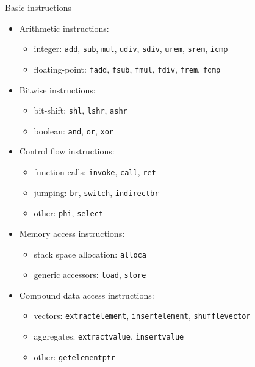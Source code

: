 \documentclass[8pt]{beamer}
\begin{document}
\begin{frame}[fragile]{Basic instructions}
  \begin{block}{}
    \begin{itemize}
      \item Arithmetic instructions:
        \begin{itemize}
          \item integer: \verb+add+, \verb+sub+, \verb+mul+, \verb+udiv+,
            \verb+sdiv+, \verb+urem+, \verb+srem+, \verb+icmp+
          \item floating-point: \verb+fadd+, \verb+fsub+, \verb+fmul+, \verb+fdiv+,
            \verb+frem+, \verb+fcmp+
        \end{itemize}

      \item Bitwise instructions:
        \begin{itemize}
          \item bit-shift: \verb+shl+, \verb+lshr+, \verb+ashr+
          \item boolean: \verb+and+, \verb+or+, \verb+xor+
        \end{itemize}

      \item Control flow instructions:
        \begin{itemize}
          \item function calls: \verb+invoke+, \verb+call+, \verb+ret+
          \item jumping: \verb+br+, \verb+switch+, \verb+indirectbr+
          \item other: \verb+phi+, \verb+select+
        \end{itemize}

      \item Memory access instructions:
        \begin{itemize}
          \item stack space allocation: \verb+alloca+
          \item generic accessors: \verb+load+, \verb+store+
        \end{itemize}

      \item Compound data access instructions:
        \begin{itemize}
          \item vectors: \verb+extractelement+, \verb+insertelement+, \verb+shufflevector+
          \item aggregates: \verb+extractvalue+, \verb+insertvalue+
          \item other: \verb+getelementptr+
        \end{itemize}


\end{itemize}
\end{block}
\end{frame}
\end{document}
